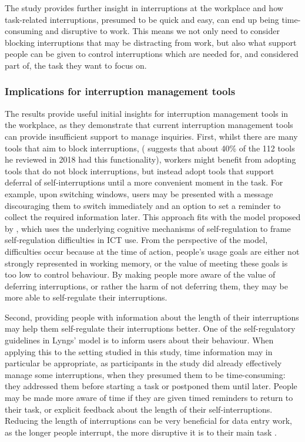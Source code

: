 The study provides further insight in interruptions at the workplace and how task-related interruptions, presumed to be quick and easy, can end up being time-consuming and disruptive to work. This means we not only need to consider blocking interruptions that may be distracting from work, but also what support people can be given to control interruptions which are needed for, and considered part of, the task they want to focus on.

\subsubsection{Implications for interruption management tools}
The results provide useful initial insights for interruption management tools in the workplace, as they demonstrate that current interruption management tools can provide insufficient support to manage inquiries. First, whilst there are many tools that aim to block interruptions, (\citet{Lyngs2018} suggests that about 40\% of the 112 tools he reviewed in 2018 had this functionality), workers might benefit from adopting tools that do not block interruptions, but instead adopt tools that support deferral of self-interruptions until a more convenient moment in the task. For example, upon switching windows, users may be presented with a message discouraging them to switch immediately and an option to set a reminder to collect the required information later. This approach fits with the model proposed by \citet{Lyngs2018}, which uses the underlying cognitive mechanisms of self-regulation to frame self-regulation difficulties in ICT use. From the perspective of the model, difficulties occur because at the time of action, people's usage goals are either not strongly represented in working memory, or the value of meeting these goals is too low to control behaviour. By making people more aware of the value of deferring interruptions, or rather the harm of not deferring them, they may be more able to self-regulate their interruptions. 

Second, providing people with information about the length of their interruptions may help them self-regulate their interruptions better. One of the self-regulatory guidelines in Lyngs' model is to inform users about their behaviour. When applying this to the setting studied in this study, time information may in particular be appropriate, as participants in the study did already effectively manage some interruptions, when they presumed them to be time-consuming: they addressed them before starting a task or postponed them until later.  People may be made more aware of time if they are given timed reminders to return to their task, or explicit feedback about the length of their self-interruptions. Reducing the length of interruptions can be very beneficial for data entry work, as the longer people interrupt, the more disruptive it is to their main task \citep{Altmann2017}.


